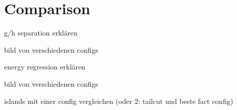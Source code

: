
\section{Comparison}
\begin{frame}{g/h separation}
    erklären

    bild von verschiedenen configs
\end{frame}

\begin{frame}{energy regression}
    erklären

    bild von verschiedenen configs
\end{frame}

\begin{frame}{islands}
    mit einer config vergleichen (oder 2: tailcut und beste fact config)
\end{frame}